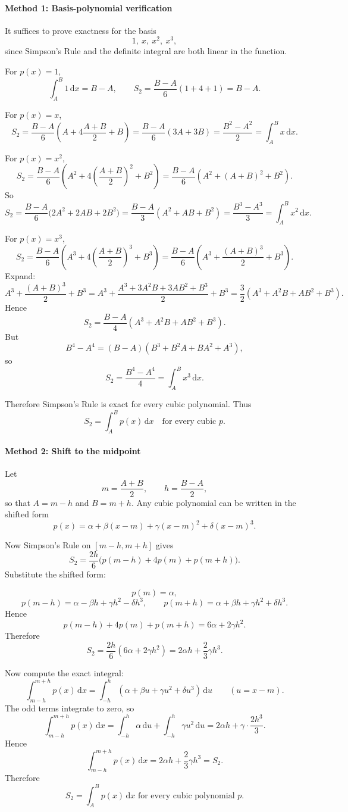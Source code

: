 \documentclass[12pt]{article}
\newcommand{\dd}{\,\mathrm{d}}
\begin{document}
\paragraph{Method 1: Basis-polynomial verification}
It suffices to prove exactness for the basis
\[
1,\ x,\ x^2,\ x^3,
\]
since Simpson's Rule and the definite integral are both linear in the function.

For \(p(x)=1\),
\[
\int_A^B 1\dd x=B-A,
\qquad
S_2=\frac{B-A}{6}(1+4+1)=B-A.
\]

For \(p(x)=x\),
\[
S_2=\frac{B-A}{6}\left(A+4\frac{A+B}{2}+B\right)
=
\frac{B-A}{6}(3A+3B)
=
\frac{B^2-A^2}{2}
=
\int_A^B x\dd x.
\]

For \(p(x)=x^2\),
\[
S_2
=
\frac{B-A}{6}\left(A^2+4\left(\frac{A+B}{2}\right)^2+B^2\right)
=
\frac{B-A}{6}\left(A^2+(A+B)^2+B^2\right).
\]
So
\[
S_2
=
\frac{B-A}{6}\bigl(2A^2+2AB+2B^2\bigr)
=
\frac{B-A}{3}(A^2+AB+B^2)
=
\frac{B^3-A^3}{3}
=
\int_A^B x^2\dd x.
\]

For \(p(x)=x^3\),
\[
S_2
=
\frac{B-A}{6}\left(A^3+4\left(\frac{A+B}{2}\right)^3+B^3\right)
=
\frac{B-A}{6}\left(A^3+\frac{(A+B)^3}{2}+B^3\right).
\]
Expand:
\[
A^3+\frac{(A+B)^3}{2}+B^3
=
A^3+\frac{A^3+3A^2B+3AB^2+B^3}{2}+B^3
=
\frac{3}{2}(A^3+A^2B+AB^2+B^3).
\]
Hence
\[
S_2
=
\frac{B-A}{4}(A^3+A^2B+AB^2+B^3).
\]
But
\[
B^4-A^4=(B-A)(B^3+B^2A+BA^2+A^3),
\]
so
\[
S_2=\frac{B^4-A^4}{4}=\int_A^B x^3\dd x.
\]

Therefore Simpson's Rule is exact for every cubic polynomial. Thus
\[
\boxed{S_2=\int_A^B p(x)\dd x \quad \text{for every cubic } p.}
\]

\paragraph{Method 2: Shift to the midpoint}
Let
\[
m=\frac{A+B}{2},
\qquad
h=\frac{B-A}{2},
\]
so that \(A=m-h\) and \(B=m+h\). Any cubic polynomial can be written in the shifted form
\[
p(x)=\alpha+\beta(x-m)+\gamma(x-m)^2+\delta(x-m)^3.
\]

Now Simpson's Rule on \([m-h,m+h]\) gives
\[
S_2=\frac{2h}{6}\bigl(p(m-h)+4p(m)+p(m+h)\bigr).
\]
Substitute the shifted form:

\[
p(m)=\alpha,
\]
\[
p(m-h)=\alpha-\beta h+\gamma h^2-\delta h^3,
\qquad
p(m+h)=\alpha+\beta h+\gamma h^2+\delta h^3.
\]
Hence
\[
p(m-h)+4p(m)+p(m+h)=6\alpha+2\gamma h^2.
\]
Therefore
\[
S_2=\frac{2h}{6}(6\alpha+2\gamma h^2)=2\alpha h+\frac{2}{3}\gamma h^3.
\]

Now compute the exact integral:
\[
\int_{m-h}^{m+h} p(x)\dd x
=
\int_{-h}^{h} (\alpha+\beta u+\gamma u^2+\delta u^3)\dd u
\qquad (u=x-m).
\]
The odd terms integrate to zero, so
\[
\int_{m-h}^{m+h} p(x)\dd x
=
\int_{-h}^{h}\alpha\dd u+\int_{-h}^{h}\gamma u^2\dd u
=
2\alpha h+\gamma\cdot \frac{2h^3}{3}.
\]
Hence
\[
\int_{m-h}^{m+h} p(x)\dd x=2\alpha h+\frac{2}{3}\gamma h^3=S_2.
\]
Therefore
\[
\boxed{S_2=\int_A^B p(x)\dd x \text{ for every cubic polynomial }p.}
\]
\end{document}
